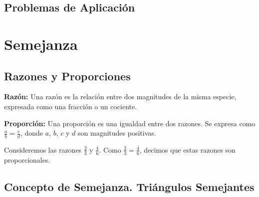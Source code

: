 \subsection{Problemas de Aplicación}











\section{Semejanza} %

\subsection{Razones y Proporciones}

\begin{definition}
    \textbf{Razón:} Una razón es la relación entre dos magnitudes de la misma especie, expresada como una fracción o un cociente. 
\end{definition}

\begin{definition}
    \textbf{Proporción:} Una proporción es una igualdad entre dos razones. Se expresa como \(\frac{a}{b} = \frac{c}{d}\), donde \(a\), \(b\), \(c\) y \(d\) son magnitudes positivas.
\end{definition}

\begin{example}
    Consideremos las razones \(\frac{2}{3}\) y \(\frac{4}{6}\). Como \(\frac{2}{3} = \frac{4}{6}\), decimos que estas razones son proporcionales.
\end{example}

\subsection{Concepto de Semejanza. Triángulos Semejantes}

